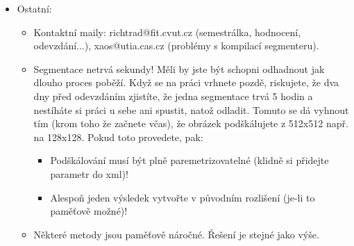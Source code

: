 \documentclass[a4paper,10pt,twocolumn]{article}
\begin{document}
\begin{itemize}
   \item Ostatní:
     \begin{itemize}
  	\item Kontaktní maily: richtrad@fit.cvut.cz (semestrálka, hodnocení, odevzdání...), xaos@utia.cas.cz (problémy s kompilací segmenteru).
  	\item Segmentace netrvá sekundy! Měli by jste být schopni odhadnout jak dlouho proces poběží. Když se na práci vrhnete pozdě, riskujete, že dva dny před odevzdáním zjistíte, že jedna segmentace trvá 5 hodin a nestíháte si práci u sebe ani spustit, natož odladit. Tomuto se dá vyhnout tím (krom toho že začnete včas), že obrázek podškálujete z 512x512 např. na 128x128. Pokud toto provedete, pak:
          \begin{itemize}
		 \item Podškálování musí být plně paremetrizovatelné (klidně si přidejte parametr do xml)!
		 \item Alespoň jeden výsledek vytvořte v původním rozlišení (je-li to paměťově možné)!
          \end{itemize}
	\item Některé metody jsou paměťově náročné. Řešení je stejné jako výše. %
      \end{itemize}
\end{itemize}
\end{document}

